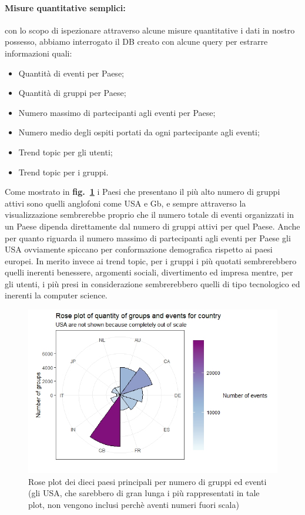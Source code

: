 \documentclass[fleqn,10pt]{SelfArx} %
\begin{document}
{\paragraph{Misure quantitative semplici:}
con lo scopo di ispezionare attraverso alcune misure quantitative i dati in nostro
possesso, abbiamo interrogato il DB creato con alcune query per estrarre informazioni quali:
\begin{itemize}[noitemsep]
\item Quantità di eventi per Paese;
\item Quantità di gruppi per Paese;
\item Numero massimo di partecipanti agli eventi per Paese;
\item Numero medio degli ospiti portati da ogni partecipante agli eventi;
\item Trend topic per gli utenti;
\item Trend topic per i gruppi.
\end{itemize}
Come mostrato in \textbf{fig.~\ref{rose_plot}} i Paesi che presentano il più alto numero di gruppi attivi sono quelli anglofoni come USA e Gb, e sempre attraverso la visualizzazione sembrerebbe proprio che il numero totale di eventi organizzati in un Paese dipenda direttamente dal numero di gruppi attivi per quel Paese.
Anche per quanto riguarda il numero massimo di partecipanti agli eventi per Paese gli USA ovviamente spiccano per conformazione demografica rispetto ai paesi europei.
In merito invece ai trend topic, per i gruppi i più quotati sembrerebbero quelli inerenti benessere, argomenti sociali, divertimento ed impresa mentre, per gli utenti, i più presi in considerazione sembrerebbero quelli di tipo tecnologico ed inerenti la computer science.
\begin{figure}
\centering
\includegraphics[width = 9.2 cm, height = 5 cm]{rose_plot_quantitative.jpeg}
\vspace*{0.01cm}
\caption{\footnotesize \label{rose_plot}Rose plot dei dieci paesi principali per
numero di gruppi ed eventi (gli USA, che sarebbero
di gran lunga i più rappresentati in tale plot, non
vengono inclusi perchè aventi numeri fuori scala)}
\end{figure}
}
\end{document}
